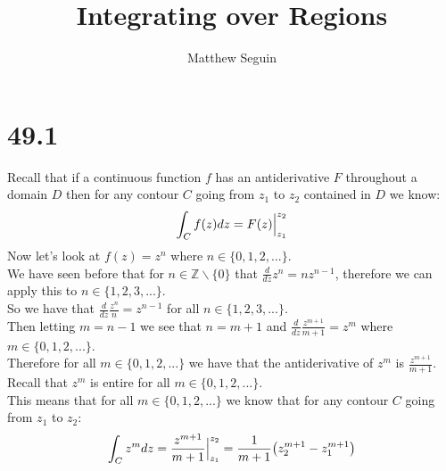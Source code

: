 \documentclass{article}
\title{Integrating over Regions}
\author{Matthew Seguin}
\date{}
\begin{document}
\maketitle

\section*{49.1}
\begin{center}
    \doublespacing
    Recall that if a continuous function $f$ has an antiderivative $F$ throughout a domain $D$ then for any contour $C$ going from $z_1$ to $z_2$ contained in $D$ we know:
    \[\int _C f(z)dz = F(z)\Big{|}_{z_1}^{z_2}\]
    Now let's look at $f(z) = z^n$ where $n\in\{0, 1, 2, ...\}$.
    \\We have seen before that for $n\in\mathbb{Z}\backslash\{0\}$ that $\frac{d}{dz} z^n = nz^{n-1}$, therefore we can apply this to $n\in\{1, 2, 3, ...\}$.
    \\So we have that $\frac{d}{dz}\frac{z^n}{n} = z^{n-1}$ for all $n\in\{1, 2, 3, ...\}$.
    \\Then letting $m = n - 1$ we see that $n = m + 1$ and $\frac{d}{dz}\frac{z^{m+1}}{m+1} = z^m$ where $m\in\{0, 1, 2, ...\}$.
    \\Therefore for all $m\in\{0, 1, 2, ...\}$ we have that the antiderivative of $z^m$ is $\frac{z^{m+1}}{m+1}$.
    \break
    \\Recall that $z^m$ is entire for all $m\in\{0, 1, 2, ...\}$.
    \\This means that for all $m\in\{0, 1, 2, ...\}$ we know that for any contour $C$ going from $z_1$ to $z_2$:
    \[\int _C z^m dz =\frac{z^{m+1}}{m+1}\Big{|}_{z_1}^{z_2} =\frac{1}{m+1}\big{(}z_2^{m+1} - z_1^{m+1}\big{)}\]
    \qedsymbol
\end{center}


\newpage
\end{document}

